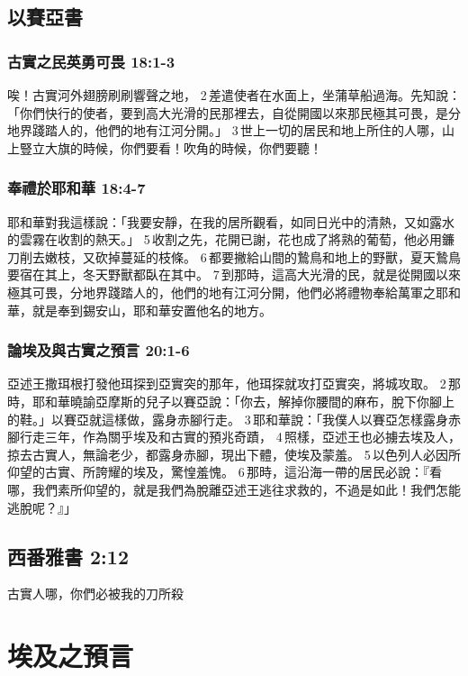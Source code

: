 \subsection{以賽亞書}
\subsubsection{古實之民英勇可畏 18:1-3}
唉！古實河外翅膀刷刷響聲之地， 2 差遣使者在水面上，坐蒲草船過海。先知說：「你們快行的使者，要到高大光滑的民那裡去，自從開國以來那民極其可畏，是分地界踐踏人的，他們的地有江河分開。」 3 世上一切的居民和地上所住的人哪，山上豎立大旗的時候，你們要看！吹角的時候，你們要聽！

\subsubsection{奉禮於耶和華 18:4-7}
耶和華對我這樣說：「我要安靜，在我的居所觀看，如同日光中的清熱，又如露水的雲霧在收割的熱天。」 5 收割之先，花開已謝，花也成了將熟的葡萄，他必用鐮刀削去嫩枝，又砍掉蔓延的枝條。 6 都要撇給山間的鷙鳥和地上的野獸，夏天鷙鳥要宿在其上，冬天野獸都臥在其中。 7 到那時，這高大光滑的民，就是從開國以來極其可畏，分地界踐踏人的，他們的地有江河分開，他們必將禮物奉給萬軍之耶和華，就是奉到錫安山，耶和華安置他名的地方。

\subsubsection{論埃及與古實之預言 20:1-6}
亞述王撒珥根打發他珥探到亞實突的那年，他珥探就攻打亞實突，將城攻取。 2 那時，耶和華曉諭亞摩斯的兒子以賽亞說：「你去，解掉你腰間的麻布，脫下你腳上的鞋。」以賽亞就這樣做，露身赤腳行走。 3 耶和華說：「我僕人以賽亞怎樣露身赤腳行走三年，作為關乎埃及和古實的預兆奇蹟， 4 照樣，亞述王也必擄去埃及人，掠去古實人，無論老少，都露身赤腳，現出下體，使埃及蒙羞。 5 以色列人必因所仰望的古實、所誇耀的埃及，驚惶羞愧。 6 那時，這沿海一帶的居民必說：『看哪，我們素所仰望的，就是我們為脫離亞述王逃往求救的，不過是如此！我們怎能逃脫呢？』」

\subsection{西番雅書 2:12}
古實人哪，你們必被我的刀所殺








\section{埃及之預言}
